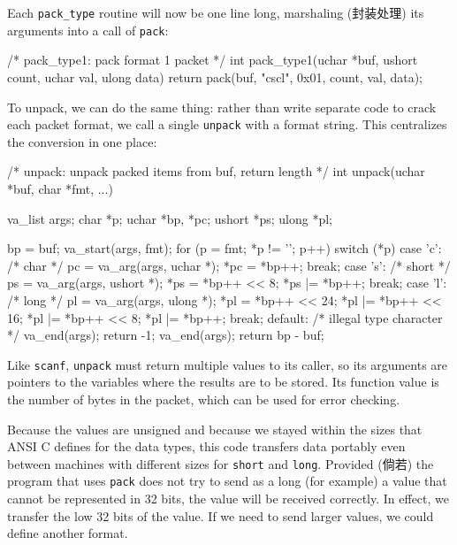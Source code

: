 Each \verb'pack_type' routine will now be one line long, marshaling
(封装处理) its arguments into a call of \verb'pack':
\begin{wellcode}
    /* pack_type1: pack format 1 packet */
    int pack_type1(uchar *buf, ushort count, uchar val, ulong data)
    {
        return pack(buf, "cscl", 0x01, count, val, data);
    }
\end{wellcode}

To unpack, we can do the same thing: rather than write separate code to
crack each packet format, we call a single \verb'unpack' with a format
string. This centralizes the conversion in one place:
\begin{wellcode}
    /* unpack: unpack packed items from buf, return length */
    int unpack(uchar *buf, char *fmt, ...)
    {
        va_list args;
        char    *p;
        uchar   *bp, *pc;
        ushort  *ps;
        ulong   *pl;

        bp = buf;
        va_start(args, fmt);
        for (p = fmt; *p != '\0'; p++) {
            switch (*p) {
            case 'c':   /* char */
                pc = va_arg(args, uchar *);
                *pc = *bp++;
                break;
            case 's':   /* short */
                ps = va_arg(args, ushort *);
                *ps = *bp++ << 8;
                *ps |= *bp++;
                break;
            case 'l':   /* long */
                pl = va_arg(args, ulong *);
                *pl = *bp++ << 24;
                *pl |= *bp++ << 16;
                *pl |= *bp++ << 8;
                *pl |= *bp++;
                break;
            default:    /* illegal type character */
                va_end(args);
                return -1;
            }
        }
        va_end(args);
        return bp - buf;
    }
\end{wellcode}
Like \verb'scanf', \verb'unpack' must return multiple values to its caller,
so its arguments are pointers to the variables where the results are to be
stored. Its function value is the number of bytes in the packet, which can
be used for error checking.

Because the values are unsigned and because we stayed within the sizes that
ANSI C defines for the data types, this code transfers data portably even
between machines with different sizes for \verb'short' and \verb'long'.
Provided (倘若) the program that uses \verb'pack' does not try to send as a
long (for example) a value that cannot be represented in 32 bits, the value
will be received correctly. In effect, we transfer the low 32 bits of the
value.  If we need to send larger values, we could define another format.

